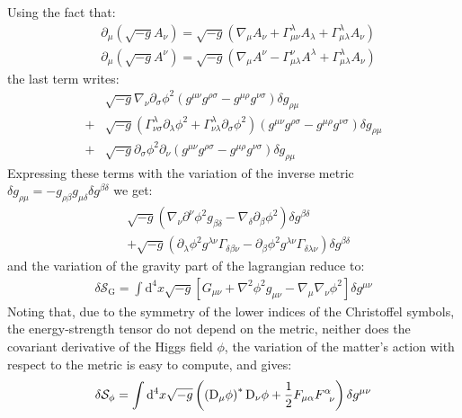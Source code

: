 Using the fact that:
\begin{align}
  &\partial_\mu\left(\sqrt{-g}A_{\nu}\right) = \sqrt{-g}\left(\nabla_\mu A_\nu +\Gamma_{\mu\nu}^{\lambda}A_{\lambda}+\Gamma_{\mu\lambda}^{\lambda}A_{\nu}\right)\\
  &\partial_\mu\left(\sqrt{-g}A^{\nu}\right) = \sqrt{-g}\left(\nabla_\mu A^\nu -\Gamma_{\mu\lambda}^{\nu}A^{\lambda}+\Gamma_{\mu\lambda}^{\lambda}A_{\nu}\right)
\end{align}
the last term writes:
\begin{align}
  & \sqrt{-g}\nabla_{\nu}\partial_\sigma\phi^2\left(g^{\mu\nu}g^{\rho\sigma}-g^{\mu\rho}g^{\nu\sigma}\right)\delta g_{\rho\mu}\\
  +& \sqrt{-g}\left(\Gamma_{\nu\sigma}^{\lambda}\partial_\lambda\phi^2+\Gamma^{\lambda}_{\nu\lambda}\partial_\sigma\phi^2\right)\left(g^{\mu\nu}g^{\rho\sigma}-g^{\mu\rho}g^{\nu\sigma}\right)\delta g_{\rho\mu}\\
  +& \sqrt{-g}\partial_\sigma\phi^2\partial_\nu\left(g^{\mu\nu}g^{\rho\sigma}-g^{\mu\rho}g^{\nu\sigma}\right)\delta g_{\rho\mu}
\end{align}
Expressing these terms with the variation of the inverse metric
$\delta g_{\rho\mu} = -g_{\rho\beta}g_{\mu\delta}\delta g^{\beta\delta}$ we get:
\begin{align}
  &\sqrt{-g}\left(\nabla_\nu\partial^\nu\phi^2g_{\beta\delta}-\nabla_\delta\partial_\beta\phi^2\right)\delta g^{\beta\delta}\\
  &+\sqrt{-g}\left(\partial_\lambda \phi^2g^{\lambda\nu}\Gamma_{\delta\beta\nu}-\partial_\beta\phi^2 g^{\lambda\nu}\Gamma_{\delta\lambda\nu}\right)\delta g^{\beta\delta}
\end{align}
and the variation of the gravity part of the lagrangian reduce to:
\begin{align}
  \delta \mathcal S_{\text{G}} = \int\mathrm d^4x\sqrt{-g}\left[G_{\mu\nu}+\nabla^2\phi^2g_{\mu\nu}-\nabla_\mu\nabla_\nu\phi^2\right]\delta g^{\mu\nu}
\end{align}
Noting that, due to the symmetry of the lower indices of the
Christoffel symbols, the energy-strength tensor do not depend on the
metric, neither does the covariant derivative of the Higgs field
$\phi$, the variation of the matter's action with respect to the
metric is easy to compute, and gives:
\begin{align}
  \delta\mathcal{S}_\phi = \int\mathrm d^4x\sqrt{-g}\left(\left(\mathrm{D}_\mu\phi\right)^*\mathrm{D}_\nu\phi+\frac{1}{2}F_{\mu\alpha}F^\alpha_{\hphantom{\alpha}\nu}\right)\delta g^{\mu\nu}
\end{align}
